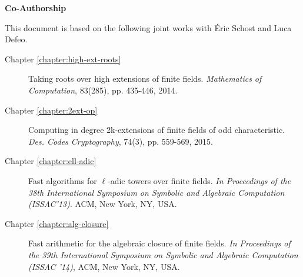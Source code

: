 
\vspace*{2in}
\begin{center}
	\large
	\textbf{Co-Authorship} \\
\end{center}
\vspace*{2cm}

This document is based on the following joint works with \'{E}ric Schost and Luca Defeo.
\begin{description}
	\item[Chapter \ref{chapter:high-ext-roots}] Taking roots over high extensions of finite 
	fields. \textit{Mathematics of Computation}, 83(285), pp. 435-446, 2014.
	\item[Chapter \ref{chapter:2ext-op}] Computing in degree 2k-extensions of finite fields of 
	odd characteristic. \textit{Des. Codes Cryptography}, 74(3), pp. 559-569, 2015.
	\item[Chapter \ref{chapter:ell-adic}] Fast algorithms for $\ell$-adic towers over finite 
	fields. 
	\textit{In Proceedings of the 38th International Symposium on Symbolic and Algebraic 
	Computation (ISSAC'13)}. ACM, New York, NY, USA.
	\item[Chapter \ref{chapter:alg-closure}] Fast arithmetic for the algebraic closure of finite 
	fields. \textit{In Proceedings of the 39th International Symposium on Symbolic and Algebraic 
	Computation (ISSAC '14)}, ACM, New York, NY, USA.
\end{description}
